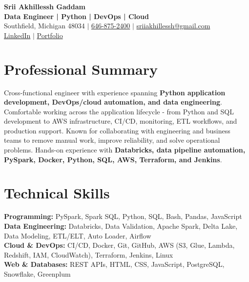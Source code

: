 \documentclass[letterpaper,10pt]{article}
\begin{document}
\fontsize{9.35pt}{10.45pt}\selectfont

\begin{center}
    {\LARGE \textbf{Srii Akhillessh Gaddam}} \\[-1pt]
    \textbf{Data Engineer | Python | DevOps | Cloud} \\[2pt]
    Southfield, Michigan 48034 $|$
    \href{tel:6468752400}{646-875-2400} $|$
    \href{mailto:sriiakhillessh@gmail.com}{sriiakhillessh@gmail.com} \\[1pt]
    \href{https://www.linkedin.com/in/srii-akhiilessh-gaddam-b48668191/}{LinkedIn} $|$
    \href{https://sriiakhillesshg.github.io/portfolio/}{Portfolio}
\end{center}
\vspace{-8pt}

\section{Professional Summary}
\small{Cross-functional engineer with experience spanning \textbf{Python application development, DevOps/cloud automation, and data engineering}. Comfortable working across the application lifecycle - from Python and SQL development to AWS infrastructure, CI/CD, monitoring, ETL workflows, and production support. Known for collaborating with engineering and business teams to remove manual work, improve reliability, and solve operational problems. Hands-on experience with \textbf{Databricks, data pipeline automation, PySpark, Docker, Python, SQL, AWS, Terraform, and Jenkins}.}

\section{Technical Skills}
\small{
\textbf{Programming:} PySpark, Spark SQL, Python, SQL, Bash, Pandas, JavaScript \\
\textbf{Data Engineering:} Databricks, Data Validation, Apache Spark, Delta Lake, Data Modeling, ETL/ELT, Auto Loader, Airflow \\
\textbf{Cloud \& DevOps:} CI/CD, Docker, Git, GitHub, AWS (S3, Glue, Lambda, Redshift, IAM, CloudWatch), Terraform, Jenkins, Linux \\
\textbf{Web \& Databases:} REST APIs, HTML, CSS, JavaScript, PostgreSQL, Snowflake, Greenplum
}

\end{document}
